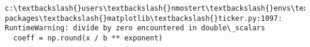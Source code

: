 \documentclass[11pt]{article}
\begin{document}
    \begin{Verbatim}[commandchars=\\\{\}]
c:\textbackslash{}users\textbackslash{}nmostert\textbackslash{}envs\textbackslash{}spew\textbackslash{}lib\textbackslash{}site-packages\textbackslash{}matplotlib\textbackslash{}ticker.py:1097: RuntimeWarning: divide by zero encountered in double\_scalars
  coeff = np.round(x / b ** exponent)

    \end{Verbatim}

    \begin{center}
    \end{center}
    { \hspace*{\fill} \\}
    
    \begin{center}
    \end{center}
    { \hspace*{\fill} \\}
    
    \begin{center}
    \end{center}
    { \hspace*{\fill} \\}
    
    \begin{center}
    \end{center}
    { \hspace*{\fill} \\}
    
    \begin{center}
    \end{center}
    { \hspace*{\fill} \\}
    
    \begin{center}
    \end{center}
    { \hspace*{\fill} \\}
    
\end{document}
